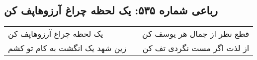 \begin{center}
\section*{رباعی شماره ۵۳۵: یک لحظه چراغ آرزوهاپف کن}
\label{sec:sh535}
\begin{longtable}{l p{0.5cm} r}
یک لحظه چراغ آرزوهاپف کن
&&
قطع نظر از جمال هر یوسف کن
\\
زین شهد یک انگشت به کام تو کشم
&&
از لذت اگر مست نگردی تف کن
\\
\end{longtable}
\end{center}
